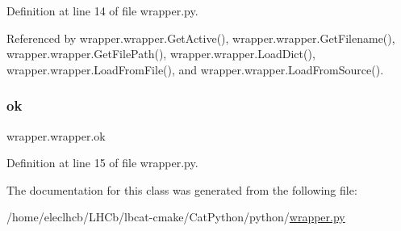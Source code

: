 Definition at line 14 of file wrapper.\+py.



Referenced by wrapper.\+wrapper.\+Get\+Active(), wrapper.\+wrapper.\+Get\+Filename(), wrapper.\+wrapper.\+Get\+File\+Path(), wrapper.\+wrapper.\+Load\+Dict(), wrapper.\+wrapper.\+Load\+From\+File(), and wrapper.\+wrapper.\+Load\+From\+Source().

\mbox{\label{classwrapper_1_1wrapper_a81f1d31a0ccc51bfdf4d8e18eff6e437}} 
\subsubsection{\texorpdfstring{ok}{ok}}
{\footnotesize\ttfamily wrapper.\+wrapper.\+ok}



Definition at line 15 of file wrapper.\+py.



The documentation for this class was generated from the following file\+:\begin{DoxyCompactItemize}
\item 
/home/eleclhcb/\+L\+H\+Cb/lbcat-\/cmake/\+Cat\+Python/python/\hyperlink{wrapper_8py}{wrapper.\+py}\end{DoxyCompactItemize}
